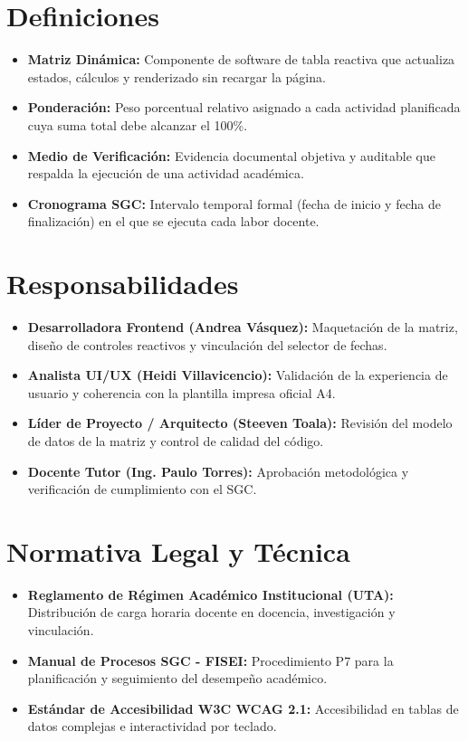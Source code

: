 \documentclass[12pt,a4paper]{article}
\begin{document}
\section{Definiciones}
\begin{itemize}[leftmargin=1.5em, itemsep=2pt]
    \item \textbf{Matriz Dinámica:} Componente de software de tabla reactiva que actualiza estados, cálculos y renderizado sin recargar la página.
    \item \textbf{Ponderación:} Peso porcentual relativo asignado a cada actividad planificada cuya suma total debe alcanzar el 100\%.
    \item \textbf{Medio de Verificación:} Evidencia documental objetiva y auditable que respalda la ejecución de una actividad académica.
    \item \textbf{Cronograma SGC:} Intervalo temporal formal (fecha de inicio y fecha de finalización) en el que se ejecuta cada labor docente.
\end{itemize}

\section{Responsabilidades}
\begin{itemize}[leftmargin=1.5em, itemsep=2pt]
    \item \textbf{Desarrolladora Frontend (Andrea Vásquez):} Maquetación de la matriz, diseño de controles reactivos y vinculación del selector de fechas.
    \item \textbf{Analista UI/UX (Heidi Villavicencio):} Validación de la experiencia de usuario y coherencia con la plantilla impresa oficial A4.
    \item \textbf{Líder de Proyecto / Arquitecto (Steeven Toala):} Revisión del modelo de datos de la matriz y control de calidad del código.
    \item \textbf{Docente Tutor (Ing. Paulo Torres):} Aprobación metodológica y verificación de cumplimiento con el SGC.
\end{itemize}

\section{Normativa Legal y Técnica}
\begin{itemize}[leftmargin=1.5em, itemsep=1.5pt]
    \item \textbf{Reglamento de Régimen Académico Institucional (UTA):} Distribución de carga horaria docente en docencia, investigación y vinculación.
    \item \textbf{Manual de Procesos SGC - FISEI:} Procedimiento P7 para la planificación y seguimiento del desempeño académico.
    \item \textbf{Estándar de Accesibilidad W3C WCAG 2.1:} Accesibilidad en tablas de datos complejas e interactividad por teclado.
\end{itemize}
\end{document}
